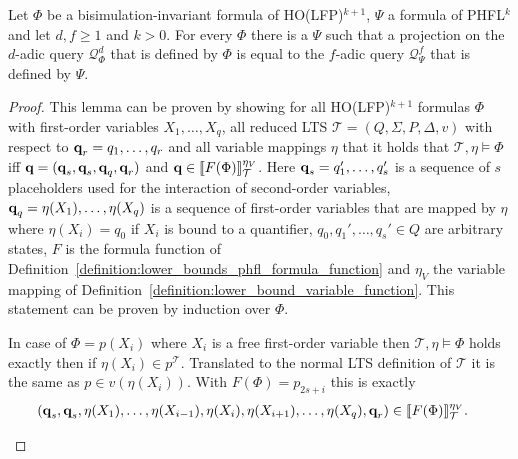 \begin{theorem}
    \label{theorem:ho_lfp_equals_phfl}
    Let $\Phi$ be a bisimulation-invariant formula of HO(LFP)$^{k + 1}$, $\Psi$ a formula of PHFL$^k$ and let $d, f \geq 1$ and $k > 0$. For every $\Phi$ there is a $\Psi$ such that a projection on the $d$-adic query $\mathcal{Q}_\Phi^d$ that is defined by $\Phi$ is equal to the $f$-adic query $\mathcal{Q}_\Psi^f$ that is defined by $\Psi$.
\end{theorem}

\begin{proof}
    This lemma can be proven by showing for all HO(LFP)$^{k+1}$ formulas $\Phi$ with first-order variables $X_1,
    \dots, X_q$, all reduced LTS $\mathcal{T} = (Q, \Sigma, P,
    \Delta, v)$ with respect to $\emph{q}_r = q_1, \dots, q_r$ and all variable mappings $\eta$ that it holds that $\mathcal{T}, \eta \models \Phi$ iff $\emph{q} =
    (\emph{q}_s, \emph{q}_s, \emph{q}_q, \emph{q}_r)$ and $\emph{q} \in \llbracket
   F(\Phi)\rrbracket^{\eta_V}_{\mathcal{T}}$. Here $\emph{q}_s = q_1',\dots,q_s'$ is a sequence of $s$ placeholders used for the interaction of second-order variables, $\emph{q}_q = \eta(X_1), \dots, \eta(X_q)$ is a sequence of first-order variables that are mapped by $\eta$ where $\eta(X_i) = q_0$ if $X_i$ is bound to a quantifier, $q_0, q_1', \dots, q_s' \in Q$ are arbitrary states, $F$ is the formula function of
    Definition~\ref{definition:lower_bounds_phfl_formula_function} and $\eta_V$ the variable mapping of
    Definition~\ref{definition:lower_bound_variable_function}. This statement can be proven by induction over $\Phi$.
    \begin{compactitem}
        \item In case of $\Phi = p(X_i)$ where $X_i$ is a free first-order variable then $\mathcal{T}, \eta \models \Phi$ holds exactly then if $\eta(X_i) \in
        p^\mathcal{T}$. Translated to the normal LTS definition of $\mathcal{T}$ it is the same as $p \in v(\eta(X_i))$.
        With $F(\Phi) = p_{2s+i}$ this is exactly
        \begin{align*}
            (\emph{q}_s, \emph{q}_s, \eta(X_1),& \dots, \eta(X_{i-1}), \eta(X_{i}), \eta(X_{i+1}), \dots, \eta(X_q), \emph{q}_r) \in
            \llbracket F(\Phi) \rrbracket^{\eta_V}_\mathcal{T}.
        \end{align*}
        

\end{compactitem}
\end{proof}
